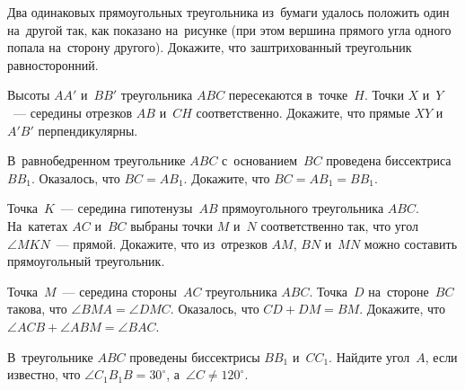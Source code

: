 


\begin{problems}

\item
Два одинаковых прямоугольных треугольника из~бумаги удалось положить один
на~другой так, как показано на~рисунке (при этом вершина прямого угла одного
попала на~сторону другого).
Докажите, что заштрихованный треугольник равносторонний.
\begin{center}
\end{center}

\item
Высоты $AA'$ и~$BB'$ треугольника $ABC$ пересекаются в~точке~$H$.
Точки $X$ и~$Y$~--- середины отрезков $AB$ и~$CH$ соответственно.
Докажите, что прямые $XY$ и~$A'B'$ перпендикулярны.

\item
В~равнобедренном треугольнике $ABC$ с~основанием~$BC$ проведена
биссектриса~$B B_1$.
Оказалось, что $B C = A B_1$.
Докажите, что $B C = A B_1 = B B_1$.

\item
Точка~$K$~--- середина гипотенузы~$AB$ прямоугольного треугольника $ABC$.
На~катетах $AC$ и~$BC$ выбраны точки $M$ и~$N$ соответственно так, что угол
$\angle MKN$~--- прямой.
Докажите, что из~отрезков $AM$, $BN$ и~$MN$ можно составить прямоугольный
треугольник.

\item
Точка~$M$~--- середина стороны~$AC$ треугольника $ABC$.
Точка~$D$ на~стороне~$BC$ такова, что $\angle BMA = \angle DMC$.
Оказалось, что $CD + DM = BM$.
Докажите, что $\angle ACB + \angle ABM = \angle BAC$.

\item
В~треугольнике $ABC$ проведены биссектрисы $B B_1$ и~$C C_1$.
Найдите угол~$A$, если известно, что $\angle C_1 B_1 B = 30^{\circ}$,
а~$\angle C \neq 120^{\circ}$.

\end{problems}

